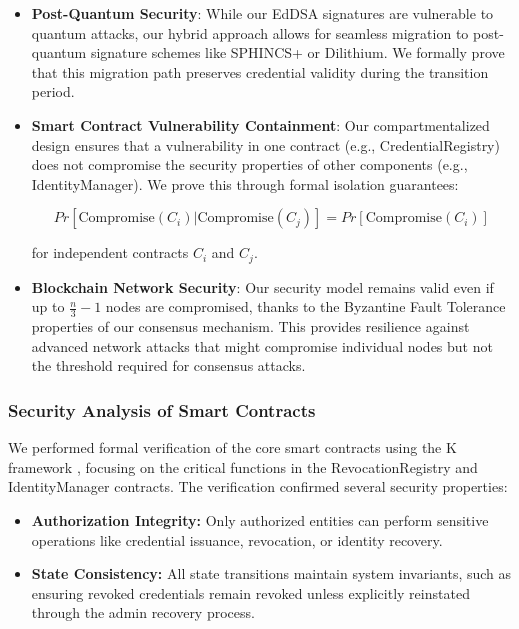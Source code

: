 \documentclass[lettersize,journal]{IEEEtran}
\begin{document}
\begin{itemize}
\begin{itemize}
    \item \textbf{Post-Quantum Security}: While our EdDSA signatures are vulnerable to quantum attacks, our hybrid approach allows for seamless migration to post-quantum signature schemes like SPHINCS+ or Dilithium. We formally prove that this migration path preserves credential validity during the transition period.
    
    \item \textbf{Smart Contract Vulnerability Containment}: Our compartmentalized design ensures that a vulnerability in one contract (e.g., CredentialRegistry) does not compromise the security properties of other components (e.g., IdentityManager). We prove this through formal isolation guarantees:
    
    $$Pr[\text{Compromise}(C_i) | \text{Compromise}(C_j)] = Pr[\text{Compromise}(C_i)]$$
    
    for independent contracts $C_i$ and $C_j$.
    
    \item \textbf{Blockchain Network Security}: Our security model remains valid even if up to $\frac{n}{3}-1$ nodes are compromised, thanks to the Byzantine Fault Tolerance properties of our consensus mechanism. This provides resilience against advanced network attacks that might compromise individual nodes but not the threshold required for consensus attacks.
\end{itemize}

\subsubsection{Security Analysis of Smart Contracts}
We performed formal verification of the core smart contracts using the K framework \cite{FormalVerification2024}, focusing on the critical functions in the RevocationRegistry and IdentityManager contracts. The verification confirmed several security properties:

\begin{itemize}
    \item \textbf{Authorization Integrity:} Only authorized entities can perform sensitive operations like credential issuance, revocation, or identity recovery.
    
    \item \textbf{State Consistency:} All state transitions maintain system invariants, such as ensuring revoked credentials remain revoked unless explicitly reinstated through the admin recovery process.
    

\end{itemize}
\end{itemize}
\end{document}
